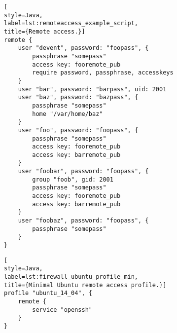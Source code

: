 \begin{lstlisting}[
style=Java,
label=lst:remoteaccess_example_script,
title={Remote access.}]
remote {
    user "devent", password: "foopass", {
        passphrase "somepass"
        access key: fooremote_pub
        require password, passphrase, accesskeys
    }
    user "bar", password: "barpass", uid: 2001
    user "baz", password: "bazpass", {
        passphrase "somepass"
        home "/var/home/baz"
    }
    user "foo", password: "foopass", {
        passphrase "somepass"
        access key: fooremote_pub
        access key: barremote_pub
    }
    user "foobar", password: "foopass", {
        group "foob", gid: 2001
        passphrase "somepass"
        access key: fooremote_pub
        access key: barremote_pub
    }
    user "foobaz", password: "foopass", {
        passphrase "somepass"
    }
}
\end{lstlisting}

\begin{lstlisting}[
style=Java,
label=lst:firewall_ubuntu_profile_min,
title={Minimal Ubuntu remote access profile.}]
profile "ubuntu_14_04", {
    remote {
        service "openssh"
    }
}
\end{lstlisting}
